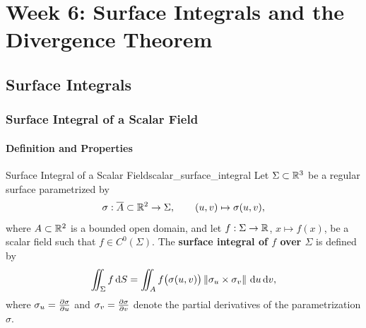 
\chapter{Week 6: Surface Integrals and the Divergence Theorem}

\section{Surface Integrals}

\subsection{Surface Integral of a Scalar Field}

\subsubsection{Definition and Properties}

\begin{definition}{Surface Integral of a Scalar Field}{scalar_surface_integral}
Let $\Sigma \subset \mathbb{R}^3$ be a regular surface parametrized by
\[
    \sigma : \overline{A} \subset \mathbb{R}^2 \to \Sigma, \qquad (u,v) \mapsto \sigma(u,v),
\]
where $A \subset \mathbb{R}^2$ is a bounded open domain, and let $f : \Sigma \to \mathbb{R}$, $x \mapsto f(x)$, be a scalar field such that $f \in C^0(\Sigma)$. The \textbf{surface integral of $f$ over $\Sigma$} is defined by
\[
    \iint_{\Sigma} f \,\mathrm{d}S = \iint_{A} f\big(\sigma(u,v)\big) \left\lVert\sigma_u \times \sigma_v\right\rVert \,\mathrm{d} u\,\mathrm{d} v,
\]
where $\sigma_u = \pdv{\sigma}{u}$ and $\sigma_v = \pdv{\sigma}{v}$ denote the partial derivatives of the parametrization $\sigma$.
\end{definition}

